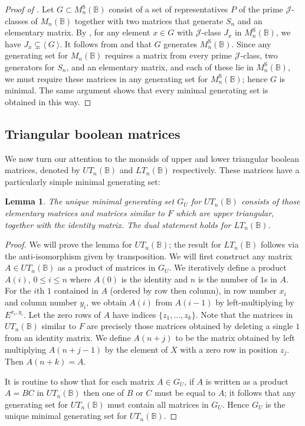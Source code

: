 \documentclass[11pt]{article}
\newtheorem{lemma}[thm]{Lemma}
\numberwithin{equation}{section}
\newcommand{\genset}[1]{\ensuremath{\langle\: #1 \:\rangle}}
\newcommand{\B}{\mathbb{B}}
\newcommand{\Bn}{M_n(\B)}
\newcommand{\Halln}{M_n^{\text{S}}(\B)}
\newcommand{\UTn}{UT_n(\B)}
\newcommand{\LTn}{LT_n(\B)}
\newcommand{\J}{\mathscr{J}}
\begin{document}
\begin{proof}[Proof of ]
  Let $G \subset \Halln$ consist of a set of representatives $P$ of the prime
  $\J$-classes of $\Bn$ together with two matrices that generate $S_n$ and an
  elementary matrix. By , for any element $x \in G$ with
  $\J$-class $J_x$ in $\Halln$, we have $J_x \subsetneq \genset{G}$. It
  follows from  and 
  that $G$ generates $\Halln$. Since any generating set for $\Bn$ requires a
  matrix from every prime $\J$-class, two generators for $S_n$, and an
  elementary matrix, and each of these lie in $\Halln$, we must require these
  matrices in any generating set for $\Halln$; hence $G$ is minimal. The same
  argument shows that every minimal generating set is obtained in this way.
\end{proof}

\subsection{Triangular boolean matrices}
\label{sec:TriBoolMat}
We now turn our attention to the monoids of upper and lower triangular boolean
matrices, denoted by $\UTn$ and $\LTn$ respectively. These matrices have a
particularly simple minimal generating set:

\begin{lemma}
  The unique minimal generating set $G_U$ for $\UTn$ consists of those
  elementary matrices and matrices similar to $F$ which are upper triangular,
  together with the identity matrix. The dual statement holds for $\LTn$.
\end{lemma}

\begin{proof}
  We will prove the lemma for $\UTn$; the result for $\LTn$ follows via the
  anti-isomorphism given by transposition.
  We will first construct any matrix $A \in \UTn$ as a product of matrices in
  $G_U$. We iteratively define a product $A(i)$, $0 \leq i \leq n$ where $A(0)$
  is the identity and $n$ is the number of $1$s in $A$. For the $i$th $1$
  contained in $A$ (ordered by row then column), in row number $x_i$ and column
  number $y_i$, we obtain $A(i)$ from $A(i - 1)$ by left-multiplying by $E^{x_i,
    y_i}$. Let the zero rows of $A$ have indices $\{z_1, \ldots, z_{k}\}$. Note
  that the matrices in $\UTn$ similar to $F$ are precisely those matrices
  obtained by deleting a single $1$ from an identity matrix. We define $A(n +
  j)$ to be the matrix obtained by left multiplying $A(n + j - 1)$ by the
  element of $X$ with a zero row in position $z_j$. Then $A(n + k) = A$.
  
  It is routine to show that for each matrix $A \in G_U$, if $A$ is written as
  a product $A = BC$ in $\UTn$ then one of $B$ or $C$ must be equal to $A$; it
  follows that any generating set for $\UTn$ must contain all matrices in $G_U$.
  Hence $G_U$ is the unique minimal generating set for $\UTn$.
\end{proof}
\end{document}

